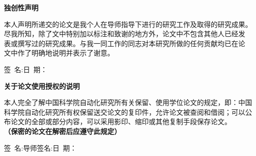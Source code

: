 \thispagestyle{empty} %
\vspace*{1.0cm}

\centerline{\erhao \song \textsf{\textbf{独创性声明}}}
\vspace*{0.5cm}
{\small
本人声明所递交的论文是我个人在导师指导下进行的研究工作及取得的研究成果。
尽我所知，除了文中特别加以标注和致谢的地方外，论文中不包含其他人已经发
表或撰写过的研究成果。与我一同工作的同志对本研究所做的任何贡献均已在论
文中作了明确地说明并表示了谢意。

\hspace*{4.5cm}签~名:\underline{\hspace{3.0cm}}日~期：\underline{\hspace{3.0cm}}}

\vspace*{3.0cm}

\centerline{\erhao \song \textsf{\textbf{关于论文使用授权的说明}}}
\vspace*{0.5cm}
{\small
本人完全了解中国科学院自动化研究所有关保留、使用学位论文的规定，即：中国
科学院自动化研究所有权保留送交论文的复印件，允许论文被查阅和借阅；可以公
布论文的全部或部分内容，可以采用影印、缩印或其他复制手段保存论文。\\
{\bf（保密的论文在解密后应遵守此规定）}
\vspace*{3.5cm}

\centerline{签~名:\underline{\hspace{3.0cm}}导师签名:\underline{\hspace{3.0cm}}日~期：\underline{\hspace{3.0cm}}}
}

